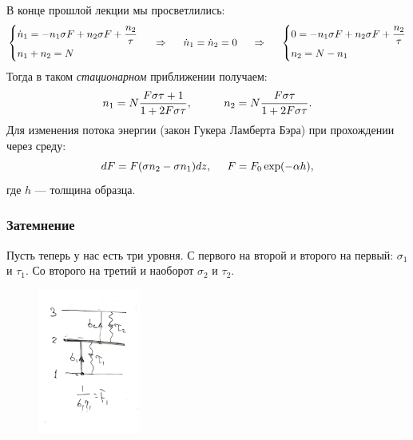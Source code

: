 В конце прошлой лекции мы просветлились:
\begin{equation*}
	\left\{
	\begin{aligned}
		&\dot{n}_1 = - n_1 \sigma F + n_2 \sigma F + \frac{n_2}{\tau}\\
		&n_1 + n_2 = N
	\end{aligned}
	\right.
	\hspace{0.5 cm}
	\Rightarrow
	\hspace{0.5 cm}
	\dot{n}_1 = \dot{n}_2 = 0
	\hspace{0.5 cm}
	\Rightarrow
	\hspace{0.5 cm}
	\left\{
	\begin{aligned}
		&0 = - n_1 \sigma F + n_2 \sigma F + \frac{n_2}{\tau}\\
		&n_2 = N- n_1
	\end{aligned}
	\right.
\end{equation*}
Тогда в таком \textit{стационарном} приближении получаем:
\begin{equation*}
	n_1 = N \frac{F \sigma \tau +1}{1 + 2 F \sigma \tau},
	\hspace{1 cm}
	n_2 = N \frac{F \sigma\tau}{1 + 2 F \sigma \tau}.
\end{equation*}
Для изменения потока энергии (закон Гукера Ламберта Бэра) при прохождении через среду:
\begin{equation*}
	d F = F(\sigma n_2 - \sigma n_1) d z,
	\hspace{0.5 cm}
	F = F_0 \exp(- \alpha h),
\end{equation*}
где $h$ --- толщина образца.

\subsubsection*{Затемнение}
Пусть теперь у нас есть три уровня. С первого на второй и второго на первый: $\sigma_1$ и $\tau_1$. Со второго на третий и наоборот $\sigma_2$ и $\tau_2$.

\begin{figure}[h]
    \centering
    \includegraphics[width=0.3\textwidth]{img/zatemn.pdf}
\end{figure}



